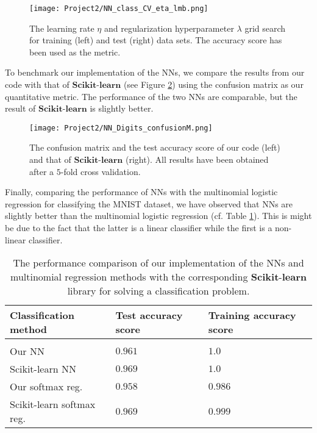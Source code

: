 \documentclass[a4paper]{article}
\begin{document}
\begin{figure}[H]
  \centering
  \texttt{[image: Project2/NN\_class\_CV\_eta\_lmb.png]}
  \caption{The learning rate $\eta$ and regularization hyperparameter $\lambda$ grid search for training (left) and test (right) data sets. The accuracy score has been used as the metric.}
    \label{NN_class_CV_eta_lmb}
\end{figure}

To benchmark our implementation of the NNs, we compare the results from our code with that of $\mathbf{Scikit}$-$\mathbf{learn}$ (see Figure \ref{NN_Digits_confusionM}) using the confusion matrix as our quantitative metric. The performance of the two NNs are comparable, but the result of $\mathbf{Scikit}$-$\mathbf{learn}$ is slightly better.

\begin{figure}[H]
  \centering
  \texttt{[image: Project2/NN\_Digits\_confusionM.png]}
  \caption{The confusion matrix and the test accuracy score of our code (left) and that of $\mathbf{Scikit}$-$\mathbf{learn}$ (right). All results have been obtained after a $5$-fold cross validation.}
    \label{NN_Digits_confusionM}
\end{figure}

Finally, comparing the performance of NNs with the multinomial logistic regression for classifying the MNIST dataset, we have observed that NNs are slightly better than the multinomial logistic regression (cf. Table \ref{classNN}). This is might be due to the fact that the latter is a linear classifier while the first is a non-linear classifier.

\begin{table}[H]
\begin{center}
  \begin{tabular}{| l | l | l |}
  \hline
    Classification method &  Test accuracy score & Training accuracy score \\[0.10cm]\hline\hline
     & &  \\
    Our NN & $0.961$ & $1.0$ \\[0.10cm]
    Scikit-learn NN & $0.969$ & $1.0$\\[0.10cm]
    Our softmax reg. & $0.958$ & $0.986$ \\[0.10cm]
    Scikit-learn softmax reg. & $0.969$ & $0.999$\\[0.10cm]
     \hline
  \end{tabular}
\end{center}
\caption{The performance comparison of our implementation of the NNs and multinomial regression methods with the corresponding  $\mathbf{Scikit}$-$\mathbf{learn}$ library for solving a classification problem.}
\label{classNN}
\end{table}
\end{document}
